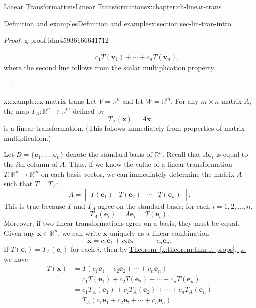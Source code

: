 \documentclass[oneside,10pt,]{book}
\newcommand{\xreffont}{\relax}
\numberwithin{equation}{section}
\newcommand{\bbm}{\begin{bmatrix}}
\newcommand{\ebm}{\end{bmatrix}}
\newcommand{\R}{\mathbb{R}}
\newcommand{\vv}{\mathbf{v}}
\newcommand{\xx}{\mathbf{x}}
\newcommand{\amp}{&}
\begin{document}
\begin{chapterptx}{Linear Transformations}{}{Linear Transformations}{}{}{x:chapter:ch-linear-trans}
\begin{sectionptx}{Definition and examples}{}{Definition and examples}{}{}{x:section:sec-lin-tran-intro}
\begin{proof}{}{g:proof:idm45936166641712}
\begin{enumerate}
\begin{align*}
\amp = c_1T(\vv_1)+\cdots +c_nT(\vv_n)\text{,}
\end{align*}
where the second line follows from the scalar multiplication property.%
\end{enumerate}
%
\end{proof}
\begin{example}{}{x:example:ex-matrix-trans}%
Let \(V=\R^n\) and let \(W=\R^m\). For any \(m\times n\) matrix \(A\), the map \(T_A:\R^n\to \R^m\) defined by%
\begin{equation*}
T_A(\xx) = A\xx
\end{equation*}
is a linear transformation. (This follows immediately from properties of matrix multiplication.)%
\par
Let \(B = \{\mathbf{e}_1,\ldots, \mathbf{e}_n\}\) denote the standard basis of \(\R^n\). Recall that \(A\mathbf{e}_i\) is equal to the \(i\)th column of \(A\). Thus, if we know the value of a linear transformation \(T:\R^n\to \R^m\) on each basis vector, we can immediately determine the matrix \(A\) such that \(T=T_A\):%
\begin{equation*}
A = \bbm T(\mathbf{e}_1) \amp T(\mathbf{e}_2) \amp \cdots \amp T(\mathbf{e}_n)\ebm\text{.}
\end{equation*}
This is true because \(T\) and \(T_A\) agree on the standard basis: for each \(i=1,2,\ldots, n\),%
\begin{equation*}
T_A(\mathbf{e}_i) = A\mathbf{e}_i = T(\mathbf{e}_i)\text{.}
\end{equation*}
Moreover, if two linear transformations agree on a basis, they must be equal. Given any \(\xx\in \R^n\), we can write \(\xx\) uniquely as a linear combination%
\begin{equation*}
\xx=c_1\mathbf{e}_1+c_2\mathbf{e}_2+\cdots + c_n\mathbf{e}_n.
\end{equation*}
If \(T(\mathbf{e}_i)=T_A(\mathbf{e}_i)\) for each \(i\), then by \hyperref[x:theorem:thm-lt-props]{Theorem~{\xreffont\ref{x:theorem:thm-lt-props}}, p.\,\pageref{x:theorem:thm-lt-props}} we have%
\begin{align*}
T(\xx) \amp = T(c_1\mathbf{e}_1+c_2\mathbf{e}_2+\cdots + c_n\mathbf{e}_n) \\
\amp = c_1T(\mathbf{e}_1)+c_2T(\mathbf{e}_2)+\cdots + c_nT(\mathbf{e}_n)\\
\amp = c_1T_A(\mathbf{e}_1)+c_2T_A(\mathbf{e}_2)+\cdots + c_nT_A(\mathbf{e}_n)\\
\amp = T_A(c_1\mathbf{e}_1+c_2\mathbf{e}_2+\cdots + c_n\mathbf{e}_n) \\

\end{align*}
\end{example}
\end{sectionptx}
\end{chapterptx}
\end{document}
